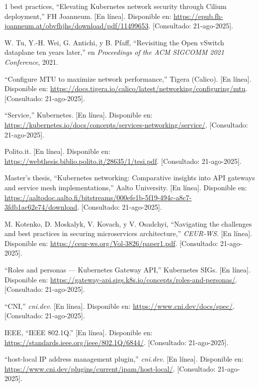 \documentclass[journal]{IEEEtran}
\begin{document}
\begin{thebibliography}{1}
best practices, ``Elevating Kubernetes network security through Cilium deployment,'' FH Joanneum. [En línea]. Disponible en: \url{https://epub.fh-joanneum.at/obvfhjhs/download/pdf/11499653}. [Consultado: 21-ago-2025].

W. Tu, Y.-H. Wei, G. Antichi, y B. Pfaff, ``Revisiting the Open vSwitch dataplane ten years later,'' en \emph{Proceedings of the ACM SIGCOMM 2021 Conference}, 2021.

``Configure MTU to maximize network performance,'' Tigera (Calico). [En línea]. Disponible en: \url{https://docs.tigera.io/calico/latest/networking/configuring/mtu}. [Consultado: 21-ago-2025].

``Service,'' Kubernetes. [En línea]. Disponible en: \url{https://kubernetes.io/docs/concepts/services-networking/service/}. [Consultado: 21-ago-2025].

Polito.it. [En línea]. Disponible en: \url{https://webthesis.biblio.polito.it/28635/1/tesi.pdf}. [Consultado: 21-ago-2025].

Master’s thesis, ``Kubernetes networking: Comparative insights into API gateways and service mesh implementations,'' Aalto University. [En línea]. Disponible en: \url{https://aaltodoc.aalto.fi/bitstreams/000efe1b-5f19-494c-a8c7-3fdb1ac62e74/download}. [Consultado: 21-ago-2025].

M. Kotenko, D. Moskalyk, V. Kovach, y V. Osadchyi, ``Navigating the challenges and best practices in securing microservices architecture,'' \emph{CEUR-WS}. [En línea]. Disponible en: \url{https://ceur-ws.org/Vol-3826/paper1.pdf}. [Consultado: 21-ago-2025].

``Roles and personas — Kubernetes Gateway API,'' Kubernetes SIGs. [En línea]. Disponible en: \url{https://gateway-api.sigs.k8s.io/concepts/roles-and-personas/}. [Consultado: 21-ago-2025].

``CNI,'' \emph{cni.dev}. [En línea]. Disponible en: \url{https://www.cni.dev/docs/spec/}. [Consultado: 21-ago-2025].

IEEE, ``IEEE 802.1Q.'' [En línea]. Disponible en: \url{https://standards.ieee.org/ieee/802.1Q/6844/}. [Consultado: 21-ago-2025].

``host-local IP address management plugin,'' \emph{cni.dev}. [En línea]. Disponible en: \url{https://www.cni.dev/plugins/current/ipam/host-local/}. [Consultado: 21-ago-2025].


\end{thebibliography}
\end{document}
